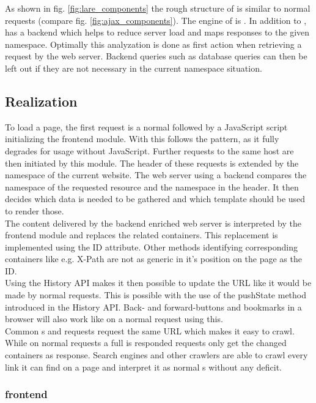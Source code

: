 \noindent{}As shown in fig. \ref{fig:lare_components} the rough structure of \lare{} is similar to normal \ajax{} requests (compare fig. \ref{fig:ajax_components}).
The \ajax{} engine of \lare{} is \lareJS{}.
In addition to \ajax{}, \lare{} has a backend which helps to reduce server load and maps responses to the given namespace.
Optimally this analyzation is done as first action when retrieving a request by the web server.
Backend queries such as database queries can then be left out if they are not necessary in the current namespace situation.


\subsection{Realization}
To load a page, the first request is a normal \httpRequest{} followed by a JavaScript script initializing the \lare{} frontend module.
With this \lare{} follows the \hijax{} pattern, as it fully degrades for usage without JavaScript.
Further requests to the same host are then initiated by this module.
The \http{} header of these requests is extended by the namespace of the current website.
The web server using a \lare{} backend compares the namespace of the requested resource and the namespace in the \http{} header.
It then decides which data is needed to be gathered and which template should be used to render those.
\\
The content delivered by the \lare{} backend enriched web server is interpreted by the frontend module and replaces the related containers.
This replacement is implemented using the ID attribute.
Other methods identifying corresponding containers like e.g. X-Path are not as generic in it's position on the page as the ID.
\\
Using the History API makes it then possible to update the URL like it would be made by normal requests.
This is possible with the use of the pushState method introduced in the History API.
Back- and forward-buttons and bookmarks in a browser will also work like on a normal request using this.
\\
Common \httpRequest{}s and \lare{} requests request the same URL which makes it easy to crawl.
While on normal requests a full \webPage{} is responded \lare{} requests only get the changed containers as response.
Search engines and other crawlers are able to crawl every link it can find on a page and interpret it as normal \webPage{}s without any deficit.

\subsubsection{\lare{} frontend\label{lare_frontend}}

